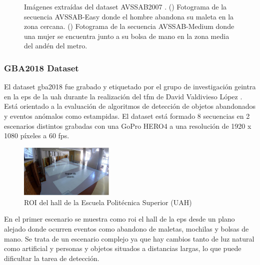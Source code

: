 \begin{figure}[ht]
\begin{subfigure}[b]{0.4\textwidth}
    \caption{}
    \label{fig:avssab2007_2}
  \end{subfigure}
  \caption{Imágenes extraídas del dataset AVSSAB2007 \cite{AVSSAB2007-dataset}.
    (\protect{}) Fotograma de la secuencia AVSSAB-Easy donde el hombre abandona su maleta en la zona cercana.
    (\protect{}) Fotograma de la secuencia AVSSAB-Medium donde una mujer se encuentra junto a su bolsa de mano en la zona media del andén del metro.}
  \label{fig:avssab2007_near_medium}
\end{figure}

\subsubsection{GBA2018 Dataset}

El dataset \gls{gba2018} \cite{gba-dataset} fue grabado y etiquetado por el grupo de investigación \gls{geintra} en la \gls{eps} de la \gls{uah} durante la realización del \gls{tfm} de David Valdivieso López \cite{valdivieso2018}. Está orientado a la evaluación de algoritmos de detección de objetos abandonados y eventos anómalos como estampidas. El dataset está formado 8 secuencias en 2 escenarios distintos grabadas con una GoPro HERO4 a una resolución de 1920 x 1080 píxeles a 60 \gls{fps}.

\begin{figure}[ht]
\centering
\includegraphics[width=0.4\textwidth]{img/chapters/resultados/datasets/hall-eps.jpg}
\caption{\label{fig:roi-hall-eps}ROI del hall de la Escuela Politécnica Superior (UAH) \cite{7743617}}
\end{figure}

En el primer escenario se muestra como \gls{roi} el hall de la \gls{eps} desde un plano alejado donde ocurren eventos como abandono de maletas, mochilas y bolsas de mano. Se trata de un escenario complejo ya que hay cambios tanto de luz natural como artificial y personas y objetos situados a distancias largas, lo que puede dificultar la tarea de detección.

